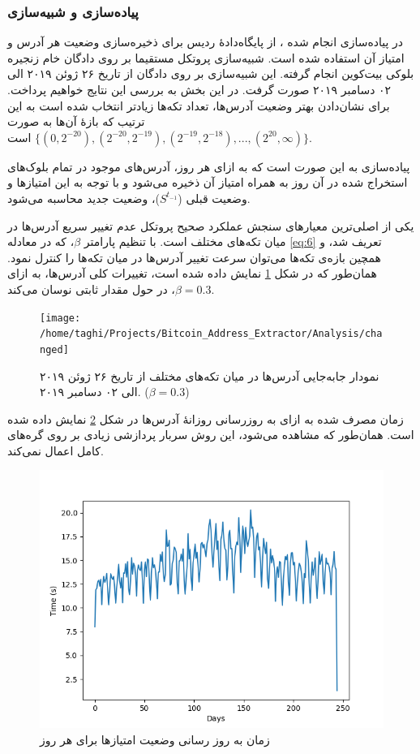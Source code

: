 \subsubsection{پیاده‌سازی و شبیه‌سازی}
\label{subsubsection:4.3.4}


در پیاده‌سازی انجام شده \cite{Badakhshan}، از پایگاه‌دادهٔ 
ردیس
برای ذخیره‌سازی وضعیت هر آدرس و امتیاز آن استفاده شده است. شبیه‌سازی پروتکل مستقیما بر روی دادگان خام زنجیره بلوکی بیت‌کوین انجام گرفته. این شبیه‌سازی بر روی دادگان از تاریخ ۲۶ ژوئن ۲۰۱۹ الی ۰۲ دسامبر ۲۰۱۹ صورت گرفت. در این بخش به بررسی این نتایج خواهیم پرداخت. برای نشان‌دادن بهتر وضعیت آدرس‌ها،  تعداد تکه‌ها زیاد‌تر انتخاب شده است به این ترتیب که بازهٔ آن‌ها به صورت
$\{(0,2^{-20}), (2^{-20}, 2^{-19}), (2^{-19}, 2^{-18}), ..., (2^{20}, \infty)\}$ 
است.

پیاده‌سازی به این صورت است که به ازای هر روز، آدرس‌های موجود در تمام بلوک‌های استخراج شده در آن روز به همراه امتیاز آن ذخیره می‌شود و با توجه به این امتیاز‌ها و وضعیت قبلی ($S^{t_{-1}}$)، وضعیت جدید محاسبه می‌شود.

یکی از اصلی‌ترین معیار‌های سنجش عملکرد صحیح پروتکل عدم تغییر سریع آدرس‌ها در میان تکه‌های مختلف است. با تنظیم پارامتر $\beta$، که در معادله \eqref{eq:6} تعریف شد، و همچین بازه‌ی تکه‌ها می‌توان سرعت تغییر آدرس‌ها در میان تکه‌ها را کنترل نمود. همان‌طور که در شکل \ref{fig:changed} نمایش داده شده است، تغییرات کلی آدرس‌ها، به ازای $\beta=0.3$، در حول مقدار ثابتی نوسان می‌کند.

\begin{figure}[h]
	\centering
	\texttt{[image: /home/taghi/Projects/Bitcoin\_Address\_Extractor/Analysis/changed]}
	\caption{%
		نمودار جابه‌جایی آدرس‌ها در میان تکه‌های مختلف از تاریخ ۲۶ ژوئن ۲۰۱۹ الی ۰۲ دسامبر ۲۰۱۹. ($\beta=0.3$)
	}
	\label{fig:changed}
\end{figure}

زمان مصرف شده به ازای به روزرسانی روزانهٔ آدرس‌ها در شکل \ref{fig:time_proposed} نمایش داده شده است. همان‌طور که مشاهده می‌شود، این روش سربار پردازشی زیادی بر روی گره‌های کامل اعمال نمی‌کند.

\begin{figure}
	\centering
	\includegraphics[width=0.7\linewidth]{image/time}
	\caption{زمان‌ به روز رسانی وضعیت امتیاز‌ها برای هر روز}
	\label{fig:time_proposed}
\end{figure}

